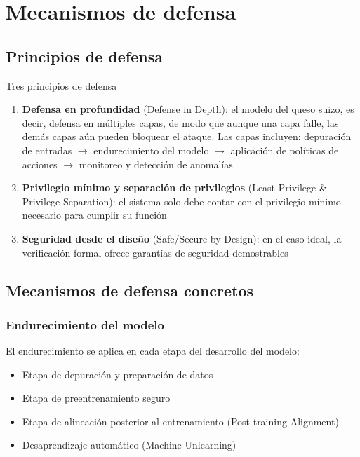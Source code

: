 \section{Mecanismos de defensa}

\subsection{Principios de defensa}

\begin{importantbox}{Tres principios de defensa}
\begin{enumerate}
    \item \textbf{Defensa en profundidad} (Defense in Depth): el modelo del queso suizo, es decir, defensa en múltiples capas, de modo que aunque una capa falle, las demás capas aún pueden bloquear el ataque. Las capas incluyen: depuración de entradas $\to$ endurecimiento del modelo $\to$ aplicación de políticas de acciones $\to$ monitoreo y detección de anomalías
    \item \textbf{Privilegio mínimo y separación de privilegios} (Least Privilege \& Privilege Separation): el sistema solo debe contar con el privilegio mínimo necesario para cumplir su función
    \item \textbf{Seguridad desde el diseño} (Safe/Secure by Design): en el caso ideal, la verificación formal ofrece garantías de seguridad demostrables
\end{enumerate}
\end{importantbox}

\subsection{Mecanismos de defensa concretos}

\subsubsection{Endurecimiento del modelo}

El endurecimiento se aplica en cada etapa del desarrollo del modelo:
\begin{itemize}
    \item Etapa de depuración y preparación de datos
    \item Etapa de preentrenamiento seguro
    \item Etapa de alineación posterior al entrenamiento (Post-training Alignment)
    \item Desaprendizaje automático (Machine Unlearning)
\end{itemize}

